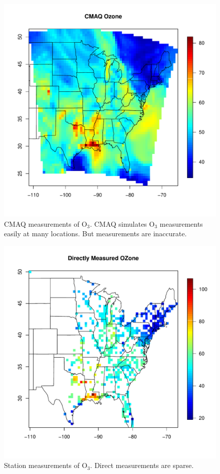 \documentclass{article}                                                   %
\def\beginmyfig{\begin{figure}[htbp]\begin{center}}                       %
\def\endmyfig{\end{center}\end{figure}}                                   %
\begin{document}
  \beginmyfig
    \includegraphics{raw/cmaq.pdf}
    \caption{CMAQ measurements of O$_3$. CMAQ simulates O$_3$ measurements
             easily at many locations. But measurements are inaccurate.}
  \endmyfig

  \beginmyfig
    \includegraphics{raw/ozone.pdf}
    \caption{Station measurements of O$_3$. Direct measurements are sparse.}
  \endmyfig
\end{document}
